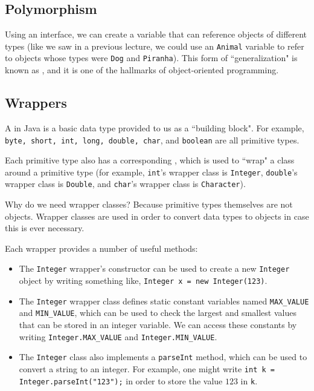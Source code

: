 \subsection{Polymorphism}

Using an interface, we can create a variable that can reference objects of different types (like we saw in a previous lecture, we could use an \verb!Animal! variable to refer to objects whose types were \verb!Dog! and \verb!Piranha!). This form of ``generalization" is known as , and it is one of the hallmarks of object-oriented programming. 

\subsection{Wrappers}

A  in Java is a basic data type provided to us as a ``building block". For example, \verb!byte, short, int, long, double, char!, and \verb!boolean! are all primitive types. 

Each primitive type also has a corresponding , which is used to ``wrap" a class around a primitive type (for example, \verb!int!'s wrapper class is \verb!Integer!, \verb!double!'s wrapper class is \verb!Double!, and \verb!char!'s wrapper class is \verb!Character!). 

Why do we need wrapper classes? Because primitive types themselves are not objects. Wrapper classes are used in order to convert data types to objects in case this is ever necessary. 

Each wrapper provides a number of useful methods:

\begin{itemize}
    \item The \verb!Integer! wrapper's constructor can be used to create a new \verb!Integer! object by writing something like, \verb!Integer x = new Integer(123)!.
    \item The \verb!Integer! wrapper class defines static constant variables named \verb!MAX_VALUE! and \verb!MIN_VALUE!, which can be used to check the largest and smallest values that can be stored in an integer variable. We can access these constants by writing \verb!Integer.MAX_VALUE! and \verb!Integer.MIN_VALUE!. 
    \item The \verb!Integer! class also implements a \verb!parseInt! method, which can be used to convert a string to an integer. For example, one might write \verb!int k = Integer.parseInt("123");! in order to store the value $123$ in \verb!k!.
\end{itemize}

